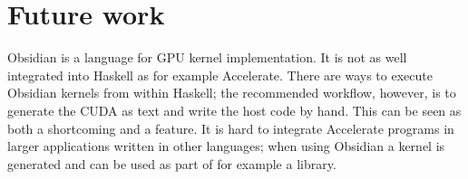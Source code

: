 \documentclass[a4paper]{book}
\begin{document}




\FloatBarrier
%
%
\section{Future work} 

Obsidian is a language for GPU kernel implementation. It is not as well integrated 
into Haskell as for example Accelerate. There are ways to execute Obsidian kernels 
from within Haskell; the recommended workflow, however, is to generate the CUDA  
as text and write the host code by hand. This can be seen as both a shortcoming 
and a feature. It is hard to integrate Accelerate programs in larger applications 
written in other languages; when using Obsidian a kernel is generated and 
can be used as part of for example a library. 
\end{document}
